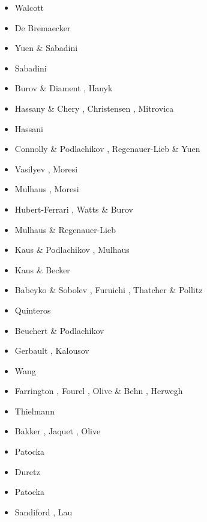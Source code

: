 \begin{scriptsize}
\begin{itemize}
\item[\nineteenseventy] Walcott \cite{walc70} 
\item[\nineteenseventyseven] De Bremaecker \cite{debr77}
\item[\nineteeneightyfour] Yuen \& Sabadini \cite{yusa84}
\item[\nineteeneightysix] Sabadini \etal \cite{sayp86}
\item[\nineteenninetyfive] Burov \& Diament \cite{budi95}, Hanyk \etal \cite{hamy95}
\item[\nineteenninetysix] Hassany \& Chery \cite{hach96b}, Christensen \cite{chri96b}, Mitrovica \cite{mitr96}
\item[\nineteenninetyseven] Hassani \etal \cite{hajc97}
\item[\nineteenninetyeight] Connolly \& Podlachikov \cite{copo98}, Regenauer-Lieb \& Yuen \cite{reyu98}
\item[\twothousandone] Vasilyev \etal \cite{vapy01}, Moresi \etal \cite{modm01}
\item[\twothousandtwo] Mulhaus \etal \cite{mumh02}, Moresi \etal \cite{modm02}
\item[\twothousandthree] Hubert-Ferrari \etal \cite{hukm03}, Watts \& Burov \cite{wabu03}
\item[\twothousandfive] Mulhaus \& Regenauer-Lieb \cite{mure05}
\item[\twothousandsix] Kaus \& Podlachikov \cite{kapo06}, Mulhaus \etal \cite{mudm06}
\item[\twothousandseven] Kaus \& Becker \cite{kabe07}
\item[\twothousandeight] Babeyko \& Sobolev \cite{baso08}, Furuichi \etal \cite{fukk08}, 
                   Thatcher \& Pollitz \cite{thpo08}
\item[\twothousandnine] Quinteros \etal \cite{qurj09}
\item[\twothousandten] Beuchert \& Podlachikov \cite{bepo10}
\item[\twothousandtwelve] Gerbault \cite{gerb12}, Kalousov \etal \cite{kasc12}
\item[\twothousandthirteen] Wang \etal \cite{wahd13}
\item[\twothousandfourteen] Farrington \etal \cite{famc14}, Fourel \etal \cite{fogm14},
                      Olive \& Behn \cite{olbe14}, Herwegh \etal \cite{hepk14}
\item[\twothousandfifteen] Thielmann \etal \cite{thkp15}
\item[\twothousandsixteen] Bakker \etal \cite{bafl16}, Jaquet \etal \cite{jads16},
                           Olive \etal \cite{olbm16}
\item[\twothousandseventeen] Patocka \cite{pact17}
\item[\twothousandeighteen] Duretz \etal \cite{dusd18}
\item[\twothousandnineteen] Patocka \etal \cite{pact19}
\item[\twothousandtwenty] Sandiford \etal \cite{sams20}, Lau \etal \cite{lahh20}
\end{itemize}
\end{scriptsize}

